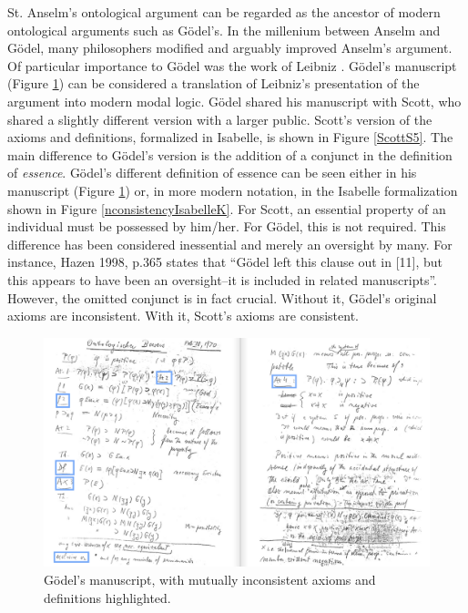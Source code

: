 \documentclass{article}
\begin{document}
St. Anselm's ontological argument \cite{Proslogion} can be regarded as the ancestor of modern ontological arguments such as G\"odel's. In the millenium between Anselm and G\"odel, many philosophers modified and arguably improved Anselm's argument. Of particular importance to G\"odel was the work of Leibniz \cite{ToDo}. 
G\"odel's manuscript (Figure \ref{GoedelScript}) can be considered a translation of Leibniz's presentation of the argument into modern modal logic. G\"odel shared his manuscript with Scott, who shared a slightly different version with a larger public. Scott's version of the axioms and definitions, formalized in Isabelle, is shown in Figure \ref{ScottS5}. The main difference to G\"odel's version is the addition of a conjunct in the definition of \emph{essence}. G\"odel's different definition of essence can be seen either in his manuscript (Figure \ref{GoedelScript}) or, in more modern notation, in the Isabelle formalization shown in Figure \ref{nconsistencyIsabelleK}. For Scott, an essential property of an individual must be possessed by him/her. For G\"odel, this is not required. This difference has been considered inessential and merely an oversight by many. For instance, Hazen 1998, p.365 \cite[p.365]{Hazen1998} states that ``G\"odel left this clause out in [11], but this appears to have been an oversight--it is included in related manuscripts''. However, the omitted conjunct is in fact crucial. Without it, G\"odel's original axioms are inconsistent. With it, Scott's axioms are consistent.

\begin{figure}
\centerline{\includegraphics[width=\textwidth]{./Images/Manuscript2.png}}
\caption{G\"{o}del's manuscript, with mutually inconsistent axioms and definitions highlighted.} \label{GoedelScript}
\end{figure}
\end{document}

